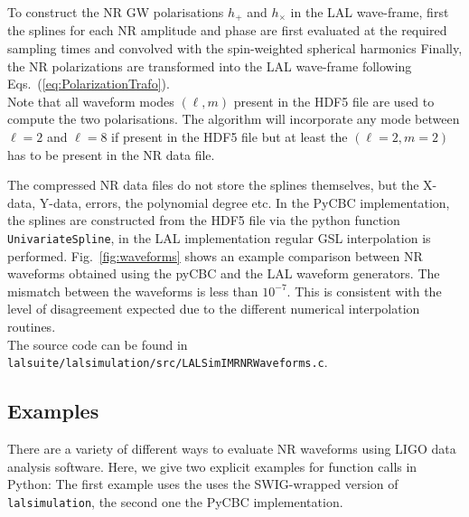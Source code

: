\documentclass[11pt,tightenlines,article,amssymb,amsmath,amsfonts,superscriptaddress,nofootinbib]{revtex4}
\begin{document}
To construct the NR GW polarisations $h_+$ and $h_\times$ in the LAL
wave-frame, first the splines for each NR amplitude and phase are
first evaluated at the required sampling times and convolved with the
spin-weighted spherical harmonics
Finally, the NR polarizations are transformed into the LAL wave-frame following Eqs.~(\ref{eq:PolarizationTrafo}). \\
Note that all waveform modes $(\ell, m)$ present in the HDF5 file are used
to compute the two polarisations. The algorithm will incorporate any mode between $\ell =2$ and $\ell =8$ if present in the
HDF5 file but at least the $(\ell=2, m=2)$ has to be present in the NR data file. 

The compressed NR data files do not store the splines themselves, but the X-data, Y-data, errors, the polynomial degree etc. In the PyCBC implementation,
the splines are constructed from the HDF5 file via the python function \texttt{UnivariateSpline}, in the LAL implementation regular GSL interpolation
is performed. Fig.~\ref{fig:waveforms} shows an example comparison between NR waveforms obtained using the pyCBC and the LAL waveform generators. The mismatch
between the waveforms is less than $10^{-7}$. This is consistent with the level of disagreement expected due to the different numerical interpolation
routines. \\
The source code can be found in \texttt{lalsuite/lalsimulation/src/LALSimIMRNRWaveforms.c}.


\subsection{Examples}
There are a variety of different ways to evaluate NR waveforms using LIGO data analysis software. Here, we give two explicit examples
for function calls in Python: The first example uses the uses the SWIG-wrapped version of \texttt{lalsimulation}, the second one the PyCBC implementation.
\end{document}
